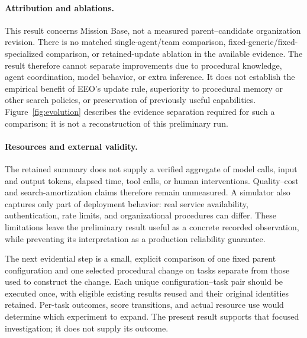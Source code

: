\paragraph{Attribution and ablations.}
This result concerns Mission Base, not a measured parent--candidate organization revision. There is no matched single-agent/team comparison, fixed-generic/fixed-specialized comparison, or retained-update ablation in the available evidence. The result therefore cannot separate improvements due to procedural knowledge, agent coordination, model behavior, or extra inference. It does not establish the empirical benefit of EEO's update rule, superiority to procedural memory or other search policies, or preservation of previously useful capabilities. Figure~\ref{fig:evolution} describes the evidence separation required for such a comparison; it is not a reconstruction of this preliminary run.

\paragraph{Resources and external validity.}
The retained summary does not supply a verified aggregate of model calls, input and output tokens, elapsed time, tool calls, or human interventions. Quality--cost and search-amortization claims therefore remain unmeasured. A simulator also captures only part of deployment behavior: real service availability, authentication, rate limits, and organizational procedures can differ. These limitations leave the preliminary result useful as a concrete recorded observation, while preventing its interpretation as a production reliability guarantee.

The next evidential step is a small, explicit comparison of one fixed parent configuration and one selected procedural change on tasks separate from those used to construct the change. Each unique configuration--task pair should be executed once, with eligible existing results reused and their original identities retained. Per-task outcomes, score transitions, and actual resource use would determine which experiment to expand. The present result supports that focused investigation; it does not supply its outcome.
